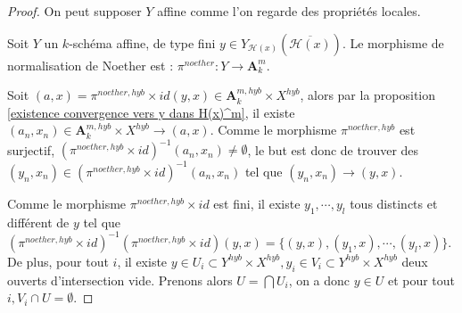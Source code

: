 \documentclass[11pt]{article}
\newcommand{\ana}{\mathbf{A}}
\begin{document}
\begin{proof}




On peut supposer $Y$ affine comme l'on regarde des propriétés locales.

Soit $Y$ un $k$-schéma affine, de type fini $y \in Y_{\mathcal{H}(x)}(\overline{\mathcal{H}(x)})$. Le morphisme de normalisation de Noether est : $\pi^{noether} : Y \rightarrow  \ana^{m}_k$.

Soit $(a,x) = \pi^{noether,hyb}\times id(y,x) \in \ana^{m,hyb}_k \times X^{hyb}$, alors par la proposition \ref{existence convergence vers y dans H(x)^m}, il existe $(a_n, x_n)\in \ana^{m,hyb}_k \times X^{hyb} \rightarrow (a,x)$. Comme le morphisme $\pi^{noether, hyb}$ est surjectif, $(\pi^{noether,hyb}\times id)^{-1}( a_n, x_n) \neq \emptyset$, le but est donc de trouver des $(y_n, x_n) \in (\pi^{noether,hyb}\times id)^{-1}( a_n, x_n)$ tel que $(y_n, x_n) \rightarrow (y,x)$. 

Comme le morphisme $\pi^{noether,hyb}\times id$ est fini, il existe $y_1, \cdots, y_l$ tous distincts et différent de $y$ tel que $(\pi^{noether,hyb}\times id)^{-1}(\pi^{noether,hyb}\times id)(y,x) = \lbrace (y,x), (y_1,x), \cdots, (y_l,x)\rbrace$. De plus, pour tout $i$, il existe $y \in U_i \subset Y^{hyb}\times X^{hyb}, y_i \in V_i \subset Y^{hyb}\times X^{hyb}$ deux ouverts d'intersection vide. Prenons alors $U =\bigcap U_i$, on a donc $y \in U$ et pour tout $i, V_i \cap U = \emptyset$.


\end{proof}
\end{document}
